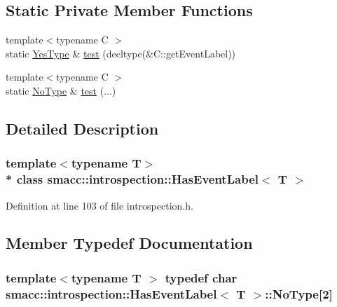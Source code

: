 \subsection*{Static Private Member Functions}
\begin{DoxyCompactItemize}
\item 
{\footnotesize template$<$typename C $>$ }\\static \hyperlink{classsmacc_1_1introspection_1_1HasEventLabel_a8d4b4c2ecb640812e11e8c1407636b6a}{Yes\+Type} \& \hyperlink{classsmacc_1_1introspection_1_1HasEventLabel_ae3239e0c7cf38f2c4f3d3210d5e418a2}{test} (decltype(\&C\+::get\+Event\+Label))
\item 
{\footnotesize template$<$typename C $>$ }\\static \hyperlink{classsmacc_1_1introspection_1_1HasEventLabel_a91b6dd8a7c59c7f24ef0937c99026e81}{No\+Type} \& \hyperlink{classsmacc_1_1introspection_1_1HasEventLabel_a8b29e9cf519f2adf6c0e8634cae63261}{test} (...)
\end{DoxyCompactItemize}


\subsection{Detailed Description}
\subsubsection*{template$<$typename T$>$\\*
class smacc\+::introspection\+::\+Has\+Event\+Label$<$ T $>$}



Definition at line 103 of file introspection.\+h.



\subsection{Member Typedef Documentation}
\subsubsection[{\texorpdfstring{No\+Type}{NoType}}]{\setlength{\rightskip}{0pt plus 5cm}template$<$typename T $>$ typedef char {\bf smacc\+::introspection\+::\+Has\+Event\+Label}$<$ T $>$\+::No\+Type\mbox{[}2\mbox{]}\hspace{0.3cm}{\ttfamily [private]}}\hypertarget{classsmacc_1_1introspection_1_1HasEventLabel_a91b6dd8a7c59c7f24ef0937c99026e81}{}\label{classsmacc_1_1introspection_1_1HasEventLabel_a91b6dd8a7c59c7f24ef0937c99026e81}



